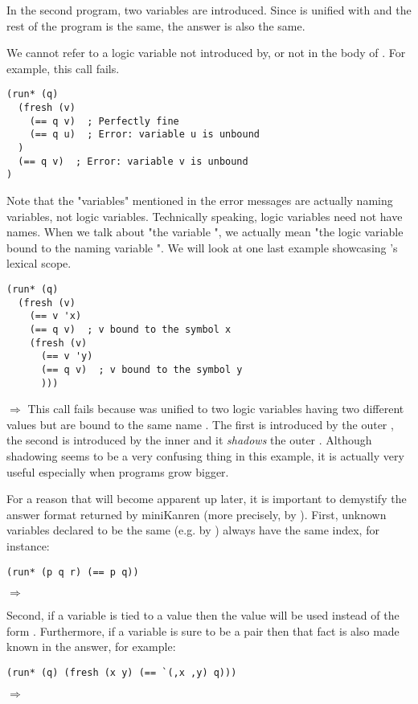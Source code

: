In the second program, two variables are introduced. Since  is unified with  and the rest of the program is the same, the answer is also the same.

We cannot refer to a logic variable not introduced by, or not in the body of . For example, this call fails.
\begin{lstlisting}
(run* (q)
  (fresh (v)
    (== q v)  ; Perfectly fine
    (== q u)  ; Error: variable u is unbound
  )
  (== q v)  ; Error: variable v is unbound
)
\end{lstlisting}
Note that the "variables" mentioned in the error messages are actually naming variables, not logic variables. Technically speaking, logic variables need not have names. When we talk about "the variable ", we actually mean "the logic variable bound to the naming variable ". We will look at one last example showcasing 's lexical scope.
\begin{lstlisting}
(run* (q)
  (fresh (v)
    (== v 'x)
    (== q v)  ; v bound to the symbol x
    (fresh (v)
      (== v 'y)
      (== q v)  ; v bound to the symbol y
      )))
\end{lstlisting}
$\Rightarrow$ \code{()}
This call fails because  was unified to two logic variables having two different values but are bound to the same name . The first  is introduced by the outer , the second  is introduced by the inner  and it \textit{shadows} the outer . Although shadowing seems to be a very confusing thing in this example, it is actually very useful especially when programs grow bigger.

For a reason that will become apparent up later, it is important to demystify the answer format returned by miniKanren (more precisely, by ). First, unknown variables declared to be the same (e.g. by \code{==}) always have the same index, for instance:
\begin{lstlisting}
(run* (p q r) (== p q))
\end{lstlisting}
$\Rightarrow$ 

Second, if a variable is tied to a value then the value will be used instead of the form . Furthermore, if a variable is sure to be a pair then that fact is also made known in the answer, for example:
\begin{lstlisting}
(run* (q) (fresh (x y) (== `(,x ,y) q)))
\end{lstlisting}
$\Rightarrow$ 

